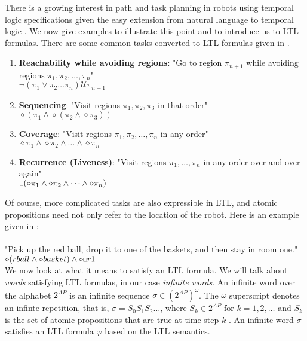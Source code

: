 There is a growing interest in path and task planning in robots using temporal logic specifications given the easy extension from natural language to temporal logic \cite{kress07}. We now give examples to illustrate this point and to introduce us to LTL formulas. There are some common tasks converted to LTL formulas given in \cite{fainekos09}. 
\begin{enumerate}
    \item \textbf{Reachability while avoiding regions}: "Go to region $\pi_{n+1}$ while avoiding regions $\pi_1, \pi_2, \dots, \pi_n$" \\ $\neg(\pi_1 \lor \pi_2 \dots \pi_n) \mathcal{U} \pi_{n+1}$ 
    \item \textbf{Sequencing}: "Visit regions $\pi_1, \pi_2, \pi_3$ in that order"\\ 
    $\diamond (\pi_1 \land \diamond(\pi_2 \land \diamond \pi_3))$ 
    \item \textbf{Coverage}: "Visit regions $\pi_1, \pi_2, \dots, \pi_n$ in any order"\\ $\diamond \pi_1 \land \diamond \pi_2 \land \dots \land \diamond \pi_n$
    \item \textbf{Recurrence (Liveness)}: "Visit regions $\pi_1, \dots, \pi_n$ in any order over and over again"\\ $\ssquare(\diamond \pi_1 \land \diamond \pi_2 \land \dots \land \diamond \pi_n)$      
\end{enumerate}
Of course, more complicated tasks are also expressible in LTL, and atomic propositions need not only refer to the location of the robot. Here is an example given in \cite{guo15}: \\ \\
"Pick up the red ball, drop it to one of the baskets, and then stay in room one." \\
$\diamond(rball \land \diamond basket) \land \diamond \ssquare r1$ \\

We now look at what it means to satisfy an LTL formula. We will talk about \textit{words} satisfying LTL formulas, in our case \textit{infinite words}. An infinite word over the alphabet $2^{AP}$ is an infinite sequence $\sigma \in (2^{AP})^\omega$. The $\omega$ superscript denotes an infinte repetition, that is, $\sigma = S_0 S_1 S_2 \dots$, where $S_k \in 2^{AP}$ for $k=1,2,\dots$ and $S_k$ is the set of atomic propositions that are true at time step $k$ \cite{guo15}. An infinite word $\sigma$ satisfies an LTL formula $\varphi$ based on the LTL semantics.  

